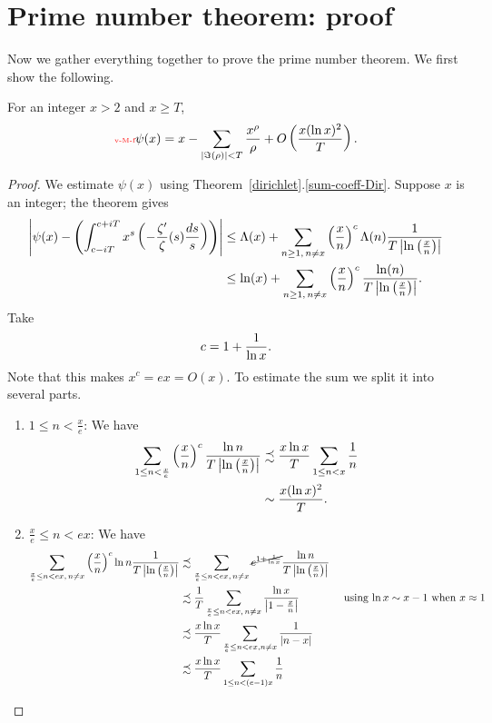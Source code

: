 \section{Prime number theorem: proof}
Now we gather everything together to prove the prime number theorem. We first show the following.
\begin{thm}
For an integer $x>2$ and $x\ge T$,
\begin{equation}\llabel{v-M-f}
\psi(x)= x-\sum_{|\Im(\rh)|<T}\frac{x^{\rh}}{\rh}
+O\pa{
\frac{x(\ln x)^2}{T}%
}.
\end{equation}
\end{thm}
\begin{proof}
 We estimate $\psi(x)$ using Theorem~\ref{dirichlet}.\ref{sum-coeff-Dir}. Suppose $x$ is an integer; the theorem gives
\begin{align*}
\left| {\psi(x)-\left( {
\int_{c-iT}^{c+iT} x^s\left( {-\frac{\zeta'}{\zeta}(s)\frac{ds}s
} \right)} \right)} \right|&\le
\Lambda(x)+
\sum_{n\ge 1,\,n\ne x} \left( {\frac{x}{n}} \right)^c\Lambda(n)\frac{1}{T\left| {\ln\left( {\frac{x}{n}} \right)} \right|}\\
&\le 
\ln(x)+\sum_{n\ge 1,\,n\ne x}\left( {\frac{x}{n}} \right)^c\frac{\ln(n)}{T\left| {\ln\left( {\frac{x}{n}} \right)} \right|}.
\end{align*}
Take
\[
c=1+\frac{1}{\ln x}.
\]
Note that this makes $x^c=ex=O(x)$. 
To estimate the sum we split it into several parts.
\begin{enumerate}
\item
$1\le n< \frac{x}{e}$: We have
\begin{align*}
\sum_{1\le n<\frac xe} \left( {\frac{x}{n}} \right)^c \frac{\ln n}{T\left| {\ln\left( {\frac{x}{n}} \right)} \right|}
&\precsim \frac{x\ln x}{T}\sum_{1\le n<x}\frac{1}{n}\\
&\sim \frac{x(\ln x)^2}{T}.
\end{align*}
\item
$\frac xe\le n< ex$: We have
\begin{align*}
\sum_{\frac xe\le n<ex,\,n\ne x}\pf xn^c \ln n\frac{1}{T\ab{\ln\pf xn}}
&\precsim \sum_{\frac xe\le n<ex,\,n\ne x} \cancel{e^{1+\rc{\ln x}}} \frac{\ln n}{T\ab{\ln\pf xn}}\\
&\precsim \rc{T}\sum_{\frac xe\le n<ex,\,n\ne x}\frac{\ln x}{\ab{1-\frac xn}}&\text{ using $\ln x\sim x-1$ when $x\approx 1$}\\
&\precsim \frac{x\ln x}{T}\sum_{\frac xe\le n<ex,n\ne x}\frac{1}{|n-x|}\\
&\precsim\frac{x\ln x}{T}\sum_{1\le n< (e-1)x}\frac{1}{n}\\

\end{align*}
\end{enumerate}
\end{proof}
